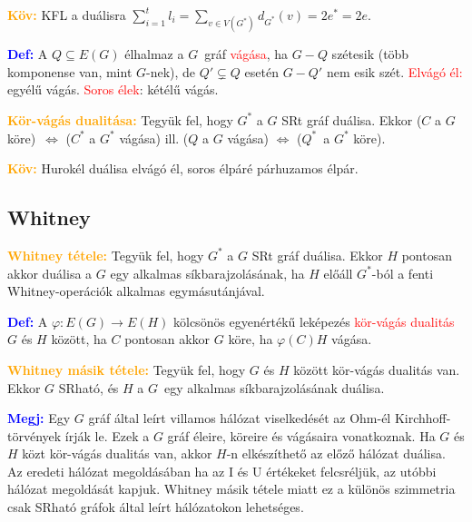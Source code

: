 \documentclass[../szamtud.tex]{subfiles}
\begin{document}
        \textcolor{orange}{\textbf{Köv:}} KFL a duálisra $\sum_{i = 1}^{t} l_i = \sum_{v \in V(G^*)}d_{G^*}(v) = 2e^* = 2e$.

        \textcolor{blue}{\textbf{Def:}} A $Q \subseteq E(G)$ élhalmaz a $G$ gráf \textcolor{red}{vágása}, ha $G - Q$ szétesik (több komponense van, mint $G$-nek), de $Q' \subsetneq Q$ esetén $G - Q'$ nem esik szét. \textcolor{red}{Elvágó él:} egyélű vágás. \textcolor{red}{Soros élek}: kétélű vágás.

        \textcolor{orange}{\textbf{Kör-vágás dualitása:}} Tegyük fel, hogy $G^*$ a $G$ SRt gráf duálisa. Ekkor ($C$ a $G$ köre) $\Longleftrightarrow$ ($C^*$ a $G^*$ vágása) ill. ($Q$ a $G$ vágása) $\Longleftrightarrow$ ($Q^*$ a $G^*$ köre). 

        \textcolor{orange}{\textbf{Köv:}} Hurokél duálisa elvágó él, soros élpáré párhuzamos élpár.

    \subsection{Whitney} 

        \textcolor{orange}{\textbf{Whitney tétele:}} Tegyük fel, hogy $G^*$ a $G$ SRt gráf duálisa. Ekkor $H$ pontosan akkor duálisa a $G$ egy alkalmas síkbarajzolásának, ha $H$ előáll $G^*$-ból a fenti Whitney-operációk alkalmas egymásutánjával.

        \textcolor{blue}{\textbf{Def:}} A $\varphi : E(G) \rightarrow E(H)$ kölcsönös egyenértékű leképezés \textcolor{red}{kör-vágás dualitás} $G$ és $H$ között, ha $C$ pontosan akkor $G$ köre, ha $\varphi(C) H$ vágása.

        \textcolor{orange}{\textbf{Whitney másik tétele:}} Tegyük fel, hogy $G$ és $H$ között kör-vágás dualitás van. Ekkor $G$ SRható, és $H$ a $G$ egy alkalmas síkbarajzolásának duálisa.
        
        \textcolor{blue}{\textbf{Megj:}} Egy $G$ gráf által leírt villamos hálózat viselkedését az Ohm-él Kirchhoff-törvények írják le. Ezek a $G$ gráf éleire, köreire és vágásaira vonatkoznak. Ha $G$ és $H$ közt kör-vágás dualitás van, akkor $H$-n elkészíthető az előző hálózat duálisa. Az eredeti hálózat megoldásában ha az I és U értékeket felcsréljük, az utóbbi hálózat megoldását kapjuk. Whitney másik tétele miatt ez a különös szimmetria csak SRható gráfok által leírt hálózatokon lehetséges.
\end{document}
